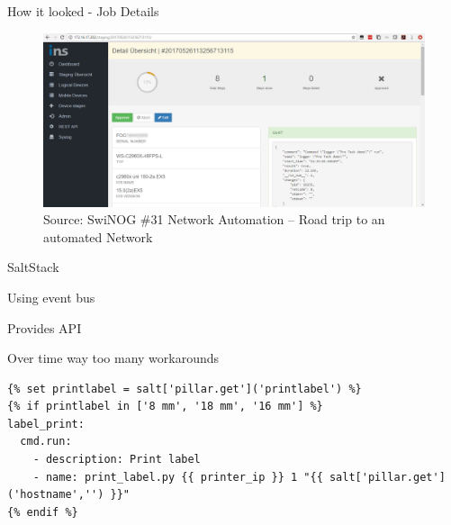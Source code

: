 \documentclass[aspectratio=169]{beamer}
\begin{document}

\begin{frame}{How it looked - Job Details}

  \begin{figure}
    \includegraphics[height = 0.78\textheight]{images/staging_robot_job_SwiNOG31.png}
    \caption{\footnotesize Source: SwiNOG \#31 Network Automation – Road trip to an automated Network}
  \end{figure}

\end{frame}


\begin{frame}[fragile]{SaltStack}

  \begin{vfilleditems}
    \item Using event bus
    \item Provides API
    \item Over time way too many workarounds
  \end{vfilleditems}
  \begin{verbatim}
{% set printlabel = salt['pillar.get']('printlabel') %}
{% if printlabel in ['8 mm', '18 mm', '16 mm'] %}
label_print:
  cmd.run:
    - description: Print label
    - name: print_label.py {{ printer_ip }} 1 "{{ salt['pillar.get']('hostname','') }}"
{% endif %}
          \end{verbatim}

\end{frame}
\end{document}
